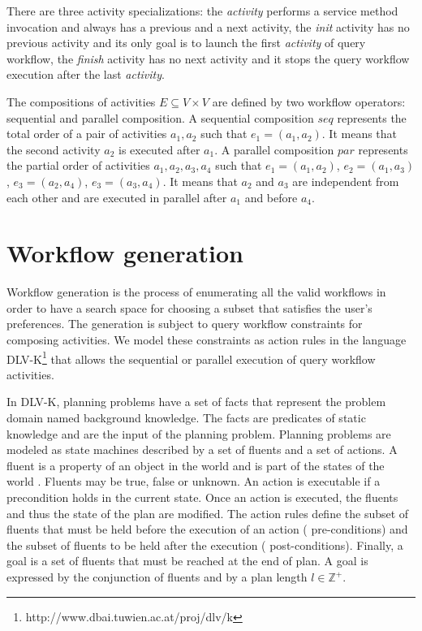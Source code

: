 \documentclass{acm_proc_article-sp}
\begin{document}
There are three activity specializations: the \textit{activity} performs a service method invocation and always has a previous and a next activity, the \textit{init} activity has no previous activity and its only goal is to launch the first \textit{activity} of query workflow, the \textit{finish} activity has no next activity and it stops the query workflow execution after the last \textit{activity}.
               
The compositions of activities $E \subseteq V \times V$ are defined by two workflow operators: sequential and parallel composition. A sequential composition $seq$ represents the total order of a pair of activities $a_1,a_2$ such that $e_1=(a_1,a_2)$. It means that the second activity $a_2$ is executed after $a_1$. A parallel composition $par$ represents the partial order of activities $a_1, a_2, a_3, a_4$ such that $e_1=(a_1,a_2)$, $e_2=(a_1,a_3)$, $e_3=(a_2,a_4)$, $e_3=(a_3,a_4)$. It means that $a_2$ and $a_3$ are independent from each other and are executed in parallel after $a_1$ and before $a_4$.
               
\section{Workflow generation} \label{sec:queryWorkflowGen}
      
Workflow generation is the process of enumerating all the valid workflows in order to have a search space for choosing a subset that satisfies the user's preferences. The generation is subject to query workflow constraints for composing activities. We model these constraints as action rules in the language DLV-K\footnote{http://www.dbai.tuwien.ac.at/proj/dlv/k} that allows the sequential or parallel execution of query workflow activities.
         
In DLV-K, planning problems have a set of facts that represent the problem domain named background knowledge. The facts are predicates of static knowledge and are the input of the planning problem. Planning problems are modeled as state machines described by a set of fluents and a set of actions. A fluent is a property of an object in the world and is part of the states of the world \cite{Baral2003}. Fluents may be true, false or unknown. An action is executable if a precondition holds in the current state. Once an action is executed, the fluents and thus the state of the plan are modified. The action rules define the subset of fluents that must be held before the execution of an action (\ie{} pre-conditions) and the subset of fluents to be held after the execution (\ie{} post-conditions). Finally, a goal is a set of fluents that must be reached at the end of plan. A goal is expressed by the conjunction of fluents and by a plan length $l \in \mathds{Z}^{+}$.
\end{document}
